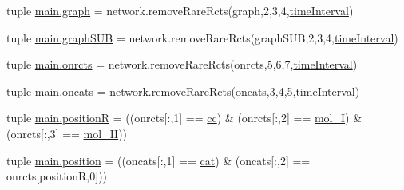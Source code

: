\begin{DoxyCompactItemize}
\item 
tuple \hyperlink{a00117_a4cfdc01ecc5ad260a4f30c9353e3d856}{main.\-graph} = network.\-remove\-Rare\-Rcts(graph,2,3,4,\hyperlink{a00028_a430673c9821c17e4bf93cd42f59e00bb}{time\-Interval})
\item 
tuple \hyperlink{a00117_ab96de87bc8cbe59221256af996bdc43e}{main.\-graph\-S\-U\-B} = network.\-remove\-Rare\-Rcts(graph\-S\-U\-B,2,3,4,\hyperlink{a00028_a430673c9821c17e4bf93cd42f59e00bb}{time\-Interval})
\item 
tuple \hyperlink{a00117_ab26ffc3eda5d201a779d705813b06348}{main.\-onrcts} = network.\-remove\-Rare\-Rcts(onrcts,5,6,7,\hyperlink{a00028_a430673c9821c17e4bf93cd42f59e00bb}{time\-Interval})
\item 
tuple \hyperlink{a00117_ab4d380bc4bfcb970acc39ddf18a73972}{main.\-oncats} = network.\-remove\-Rare\-Rcts(oncats,3,4,5,\hyperlink{a00028_a430673c9821c17e4bf93cd42f59e00bb}{time\-Interval})
\item 
tuple \hyperlink{a00117_adbbdc0f6ad0f08400b3e492f7a807a6b}{main.\-position\-R} = ((onrcts\mbox{[}\-:,1\mbox{]} == \hyperlink{a00028_afb5980388a6e55ca55437b53cdaf528a}{cc}) \& (onrcts\mbox{[}\-:,2\mbox{]} == \hyperlink{a00028_ab346189eef5359a07ba32144ddcd4465}{mol\-\_\-\-I}) \& (onrcts\mbox{[}\-:,3\mbox{]} == \hyperlink{a00028_a4d2c086887289f8900b38ffa56854da3}{mol\-\_\-\-I\-I}))
\item 
tuple \hyperlink{a00117_ac67c60df3cc9afae7e4888d2b48b846d}{main.\-position} = ((oncats\mbox{[}\-:,1\mbox{]} == \hyperlink{a00028_a7073f71a43389f3032e69b1fffc2551a}{cat}) \& (oncats\mbox{[}\-:,2\mbox{]} == onrcts\mbox{[}position\-R,0\mbox{]}))
\end{DoxyCompactItemize}
